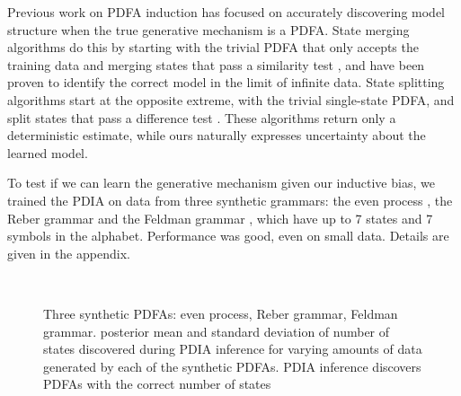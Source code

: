 
Previous work on PDFA induction has focused on accurately discovering model structure when the true generative mechanism is a PDFA.  State merging algorithms do this by starting with the trivial PDFA that only accepts the training data and merging states that pass a similarity test \cite{Carrasco1994,Thollard2000}, and have been proven to identify the correct model in the limit of infinite data.  State splitting algorithms start at the opposite extreme, with the trivial single-state PDFA, and split states that pass a difference test \cite{Ron1996,Shalizi2004}.  These algorithms return only a deterministic estimate, while ours naturally expresses uncertainty about the learned model.

To test if we can learn the generative mechanism given our inductive bias, we trained the PDIA on data from three synthetic grammars: the even process \cite{Shalizi2004}, the Reber grammar \cite{Reber1967} and the Feldman grammar \cite{Feldman1966}, which have up to 7 states and 7 symbols in the alphabet.  Performance was good, even on small data.  Details are given in the appendix.



\begin{figure}[htbp]
\centering
{} \hspace{-.55cm} 
  \hspace{-1.25cm} 
 \\
\label{fig:synthetic_grammar_and_synth_results}
\caption{Three synthetic PDFAs:  even process,  Reber grammar,  Feldman grammar.   posterior mean and standard deviation of number of states discovered during PDIA inference for varying amounts of data generated by each of the synthetic PDFAs.  PDIA inference discovers PDFAs with the correct number of states}
\end{figure}